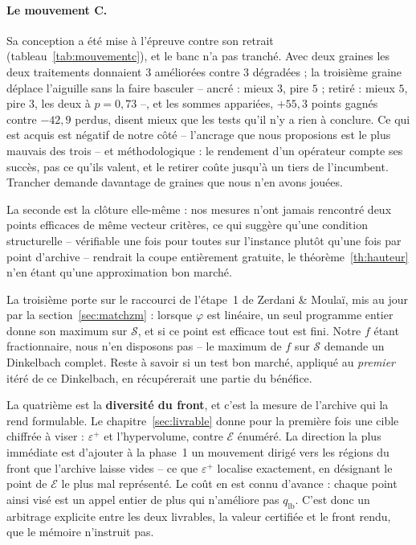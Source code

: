 \documentclass[11pt,a4paper]{article}
\theoremstyle{plain}
\theoremstyle{remark}
\newcommand{\Ecal}{\mathcal{E}}
\newcommand{\Scal}{\mathcal{S}}
\begin{document}
\paragraph{Le mouvement C.} Sa conception a été mise à l'épreuve contre son
retrait (tableau~\ref{tab:mouvementc}), et le banc n'a pas tranché.
Avec deux graines les deux traitements donnaient $3$ améliorées contre $3$
dégradées ; la troisième graine déplace l'aiguille sans la faire basculer --
ancré : mieux $3$, pire $5$ ; retiré : mieux $5$, pire $3$, les deux à
$p=0{,}73$ --, et les sommes appariées, $+55{,}3$ points gagnés contre
$-42{,}9$ perdus, disent mieux que les tests qu'il n'y a rien à conclure. Ce qui est acquis est négatif de notre côté -- l'ancrage que nous
proposions est le plus mauvais des trois -- et méthodologique : le rendement
d'un opérateur compte ses succès, pas ce qu'ils valent, et le retirer coûte
jusqu'à un tiers de l'incumbent. Trancher demande davantage de graines que
nous n'en avons jouées.

La seconde est la clôture elle-même : nos mesures n'ont jamais rencontré
deux points efficaces de même vecteur critères, ce qui suggère qu'une
condition structurelle -- vérifiable une fois pour toutes sur l'instance
plutôt qu'une fois par point d'archive -- rendrait la coupe entièrement
gratuite, le théorème~\ref{th:hauteur} n'en étant qu'une approximation
bon marché.

La troisième porte sur le raccourci de l'étape~1 de Zerdani \& Moulaï,
mis au jour par la section~\ref{sec:matchzm} : lorsque $\varphi$ est
linéaire, un seul programme entier donne son maximum sur $\Scal$, et si ce
point est efficace tout est fini. Notre $f$ étant fractionnaire, nous n'en
disposons pas -- le maximum de $f$ sur $\Scal$ demande un Dinkelbach
complet. Reste à savoir si un test bon marché, appliqué au \emph{premier}
itéré de ce Dinkelbach, en récupérerait une partie du bénéfice.

La quatrième est la \textbf{diversité du front}, et c'est la mesure de
l'archive qui la rend formulable. Le chapitre~\ref{sec:livrable} donne pour la première fois une cible chiffrée à viser : $\varepsilon^+$ et
l'hypervolume, contre $\Ecal$ énuméré. La direction la plus immédiate est
d'ajouter à la phase~1 un mouvement dirigé vers les régions du front que
l'archive laisse vides -- ce que $\varepsilon^+$ localise exactement, en
désignant le point de $\Ecal$ le plus mal représenté. Le coût en est connu
d'avance : chaque point ainsi visé est un appel entier de plus qui
n'améliore pas $q_{\text{lb}}$. C'est donc un arbitrage explicite entre les
deux livrables, la valeur certifiée et le front rendu, que le mémoire
n'instruit pas.
\end{document}
